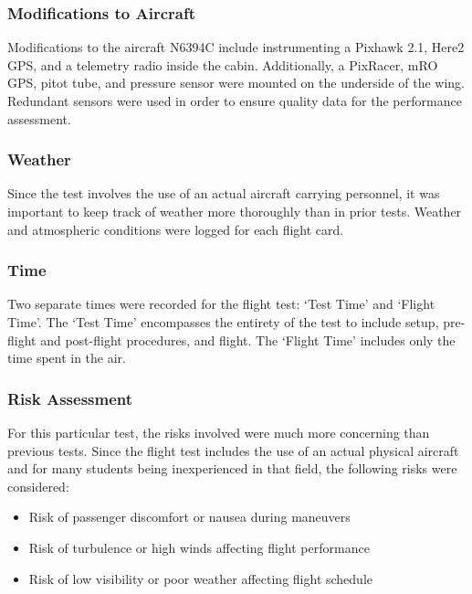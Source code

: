 \documentclass[conf]{new-aiaa}
\begin{document}
\medskip


\subsubsection{Modifications to Aircraft}

Modifications to the aircraft N6394C include instrumenting a Pixhawk 2.1, Here2 GPS, and a telemetry radio inside the cabin. Additionally, a PixRacer, mRO GPS, pitot tube, and pressure sensor were mounted on the underside of the wing. Redundant sensors were used in order to ensure quality data for the performance assessment.

\subsubsection{Weather}

Since the test involves the use of an actual aircraft carrying personnel, it was important to keep track of weather more thoroughly than in prior tests. Weather and atmospheric conditions were logged for each flight card.


\subsubsection{Time}

Two separate times were recorded for the flight test: `Test Time' and `Flight Time'. The `Test Time' encompasses the entirety of the test to include setup, pre-flight and post-flight procedures, and flight. The `Flight Time' includes only the time spent in the air.

\subsubsection{Risk Assessment}

For this particular test, the risks involved were much more concerning than previous tests. Since the flight test includes the use of an actual physical aircraft and for many students being inexperienced in that field, the following risks were considered:

\medskip
\begin{itemize}
\item Risk of passenger discomfort or nausea during maneuvers
\item Risk of turbulence or high winds affecting flight performance
\item Risk of low visibility or poor weather affecting flight schedule
\end{itemize}
\end{document}
